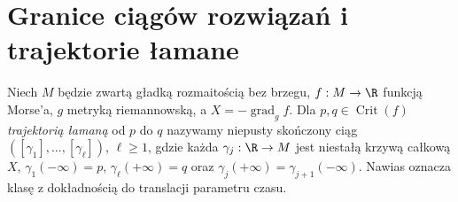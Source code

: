 \section{Granice ciągów rozwiązań i trajektorie łamane}
\begin{definicja}
\label{def:broken-morse-v11}
Niech $M$ będzie zwartą gładką rozmaitością bez brzegu,
$f:M\to\R$ funkcją Morse'a, $g$ metryką riemannowską,
a $X=-\operatorname{grad}_g f$.
Dla $p,q\in\operatorname{Crit}(f)$ \emph{trajektorią łamaną}
od $p$ do $q$ nazywamy niepusty skończony ciąg
$([\gamma_1],\ldots,[\gamma_\ell])$, $\ell\ge1$,
gdzie każda $\gamma_j:\R\to M$ jest niestałą krzywą całkową $X$,
$\gamma_1(-\infty)=p$, $\gamma_\ell(+\infty)=q$ oraz
$\gamma_j(+\infty)=\gamma_{j+1}(-\infty)$.
Nawias oznacza klasę z dokładnością do translacji parametru czasu.
\end{definicja}

